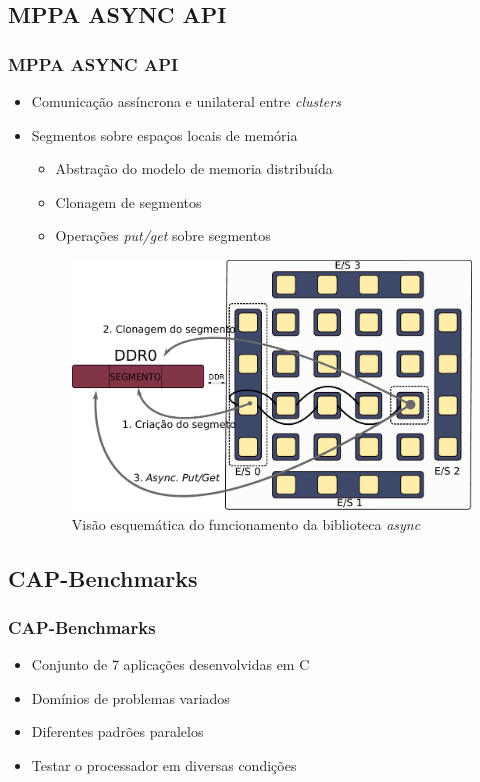 \documentclass[xcolor={table}]{beamer}
\begin{document}
\subsection{MPPA ASYNC API}
\begin{frame}\frametitle{MPPA ASYNC API \cite{Hascoet2017}}
    \begin{itemize}
        \item {Comunicação assíncrona e unilateral entre \textit{clusters}}
        \item {Segmentos sobre espaços locais de memória}
        \begin{itemize}
            \item Abstração do modelo de memoria distribuída
            \item Clonagem de segmentos
            \item Operações \textit{put/get} sobre segmentos
        \end{itemize}
        \begin{figure}
            \centering
            \includegraphics[width=.6\linewidth, keepaspectratio]{figs/putget.pdf}
            \caption{Visão esquemática do funcionamento da biblioteca \textit{async}}
            \label{fig:putget}
        \end{figure}
    \end{itemize}
\end{frame}

\subsection{CAP-Benchmarks}
\begin{frame}\frametitle{CAP-Benchmarks \cite{Castro-Souza-CCPE:2016}}
    \begin{itemize}
        \item {Conjunto de 7 aplicações desenvolvidas em C}
    	\item {Domínios de problemas variados}
    	\item {Diferentes padrões paralelos}
    	\item {Testar o processador em diversas condições}
    \end{itemize}
\end{frame}
\end{document}
